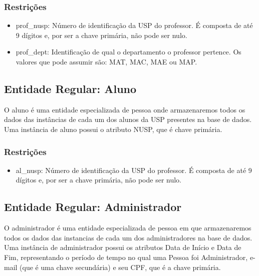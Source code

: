 \documentclass{article}
\begin{document}
  		\subsubsection{Restrições}
  		    \begin{itemize}
  		        \item prof\_nusp: Número de identificação da USP do professor. É composta de até 9 dígitos e, por ser a chave primária, não pode ser nulo. 
  		        \item prof\_dept: Identificação de qual o departamento o professor pertence. Os valores que pode assumir são: MAT, MAC, MAE ou MAP.
  		    \end{itemize}
  		    
  	\subsection{Entidade Regular: Aluno}
  	    \quad O aluno é uma entidade especializada de pessoa onde armazenaremos todos os dados das instâncias de cada um dos alunos da USP presentes na base de dados. \\
  	    \null \quad Uma instância de aluno possui o atributo NUSP, que é chave primária.
  	    \subsubsection{Restrições}
  	        \begin{itemize}
  		        \item al\_nusp: Número de identificação da USP do professor. É composta de até 9 dígitos e, por ser a chave primária, não pode ser nulo. 
  		    \end{itemize}
  		    
  	\subsection{Entidade Regular: Administrador}
  	    \quad O administrador é uma entidade especializada de pessoa em que armazenaremos todos os dados  das instancias de cada um dos administradores na base de dados. \\
  	    \null \quad Uma instância de administrador possui os atributos Data de Início e Data de Fim, representando o período de tempo no qual uma Pessoa foi Administrador, e-mail (que é uma chave secundária) e seu CPF, que é a chave primária.
\end{document}
